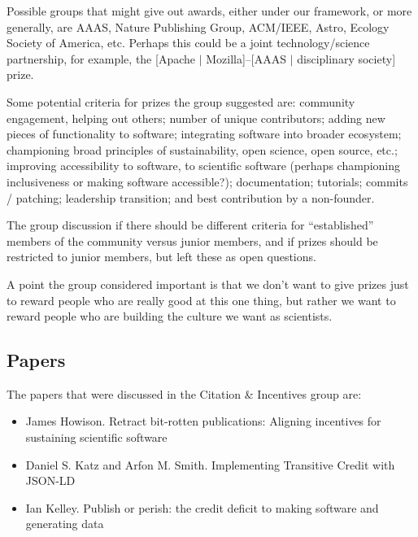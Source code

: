 \documentclass[11pt, oneside]{amsart}
\begin{document}
Possible groups that might give out awards, either under our framework, or more generally,
are AAAS, Nature Publishing Group, ACM/IEEE, Astro, Ecology
Society of America, etc. Perhaps this could be a joint technology/science
partnership, for example, the [Apache $|$ Mozilla]--[AAAS $|$ disciplinary
society] prize.

Some potential criteria for prizes the group suggested are:
community engagement, helping out others;
number of unique contributors;
adding new pieces of functionality to software;
integrating software into broader ecosystem; championing broad principles of
sustainability, open science, open source, etc.;
improving accessibility to software, to scientific software (perhaps championing
inclusiveness or making software accessible?);
documentation;
tutorials;
commits / patching;
leadership transition; and
best contribution by a non-founder.

The group discussion if there should be different criteria for ``established''
members of the community versus junior members, and if prizes should be
restricted to junior members, but left these as open questions.

A point the group considered important is that we don't want to give prizes just
to reward people who are really good at this one thing, but rather we want to
reward people who are building the culture we want as scientists.

 



\subsection{Papers}
The papers that were discussed in the Citation \& Incentives group are:
\begin{itemize}
\item James Howison. Retract bit-rotten publications: Aligning incentives for
sustaining scientific software~\cite{wssspe2_howison}

\item Daniel S. Katz and Arfon M. Smith. Implementing Transitive Credit with
{JSON-LD}~\cite{wssspe2_katz}

\item Ian Kelley. Publish or perish: the credit deficit to making software and
generating data~\cite{wssspe2_kelley}
\end{itemize}
\end{document}
